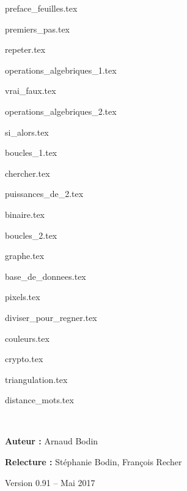 \documentclass[12pt]{report}
\begin{document}
\renewcommand{\contentsname}{Sommaire}

{preface_feuilles.tex}

\debutchapitres


{premiers_pas.tex}

{repeter.tex}

{operations_algebriques_1.tex}

{vrai_faux.tex}

{operations_algebriques_2.tex}

{si_alors.tex} 

{boucles_1.tex} 

{chercher.tex}

{puissances_de_2.tex} 

{binaire.tex}

{boucles_2.tex} 

{graphe.tex}

{base_de_donnees.tex}

{pixels.tex}

{diviser_pour_regner.tex}

{couleurs.tex}

{crypto.tex}

{triangulation.tex}

{distance_mots.tex}

\newpage
\ 
\vfill

\vspace*{5cm}


\textbf{Auteur :} Arnaud Bodin

\textbf{Relecture :} Stéphanie Bodin, François Recher

%

\vspace*{1cm}

\centerline{Version 0.91 -- Mai 2017}

\vspace*{1cm}
\end{document}
